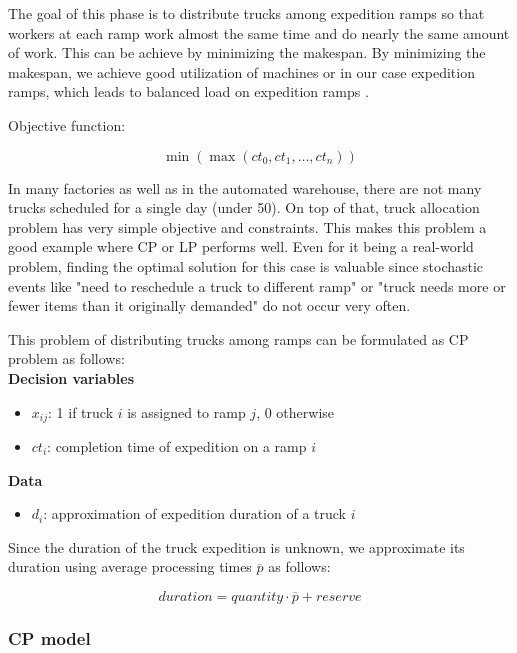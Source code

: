 \documentclass{ctuthesis}
\begin{document}
The goal of this phase is to distribute trucks among expedition ramps so that workers at each ramp work almost the same time and do nearly the same amount of work. This can be achieve by minimizing the makespan. By minimizing the makespan, we achieve good utilization of machines or in our case expedition ramps, which leads to balanced load on expedition ramps \cite{pinedo}. 

 Objective function:
 
 \begin{equation}
     \min(\max(ct_0, ct_1, \ldots, ct_n))
 \end{equation}

In many factories as well as in the automated warehouse, there are not many trucks scheduled for a single day (under 50). On top of that, truck allocation problem has very simple objective and constraints. This makes this problem a good example where CP or LP performs well. Even for it being a real-world problem, finding the optimal solution for this case is valuable since stochastic events like "need to reschedule a truck to different ramp" or "truck needs more or fewer items than it originally demanded" do not occur very often.

This problem of distributing trucks among ramps can be formulated as CP problem as follows:\\

\noindent \textbf{Decision variables}

\begin{itemize}
\item $x_{ij}$: 1 if truck $i$ is assigned to ramp $j$, 0 otherwise
\item$ct_i$: completion time of expedition on a ramp $i$
\end{itemize}
\textbf{Data}
\begin{itemize}
\item$d_i$: approximation of expedition duration of a truck $i$
\end{itemize}

Since the duration of the truck expedition is unknown, we approximate its duration using average processing times $\overline{p}$ as follows:

\begin{equation}
     duration = quantity \cdot \overline{p} + reserve
\end{equation}

\subsubsection{CP model}
\end{document}
